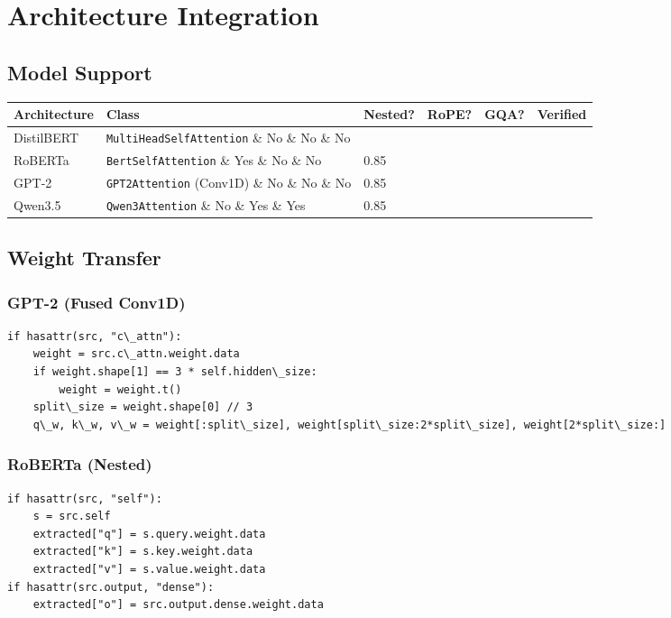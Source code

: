 
\section{Architecture Integration}

\subsection{Model Support}

\begin{table}[H]
\centering
\small
\begin{tabular}{llllll}
\toprule
\textbf{Architecture} & \textbf{Class} & \textbf{Nested?} & \textbf{RoPE?} & \textbf{GQA?} & \textbf{Verified} \\
\midrule
DistilBERT & \texttt{MultiHeadSelfAttention} \& No \& No \& No &  \\
RoBERTa & \texttt{BertSelfAttention} \& Yes \& No \& No & 0.85 \\
GPT-2 & \texttt{GPT2Attention} (Conv1D) \& No \& No \& No & 0.85 \\
Qwen3.5 & \texttt{Qwen3Attention} \& No \& Yes \& Yes & 0.85 \\
\bottomrule
\end{tabular}
\end{table}

\subsection{Weight Transfer}

\subsubsection{GPT-2 (Fused Conv1D)}

\begin{lstlisting}
if hasattr(src, "c\_attn"):
    weight = src.c\_attn.weight.data
    if weight.shape[1] == 3 * self.hidden\_size:
        weight = weight.t()
    split\_size = weight.shape[0] // 3
    q\_w, k\_w, v\_w = weight[:split\_size], weight[split\_size:2*split\_size], weight[2*split\_size:]
\end{lstlisting}

\subsubsection{RoBERTa (Nested)}

\begin{lstlisting}
if hasattr(src, "self"):
    s = src.self
    extracted["q"] = s.query.weight.data
    extracted["k"] = s.key.weight.data
    extracted["v"] = s.value.weight.data
if hasattr(src.output, "dense"):
    extracted["o"] = src.output.dense.weight.data
\end{lstlisting}

